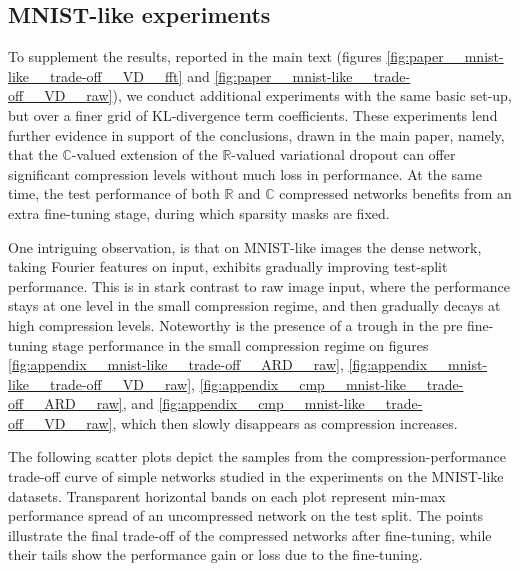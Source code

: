 \documentclass[a4paper,10pt]{article}
\newcommand{\real}{\mathbb{R}}
\newcommand{\cplx}{\mathbb{C}}
\begin{document}

\subsection{MNIST-like experiments} %
\label{sub:mnist_like_experiments}

To supplement the results, reported in the main text (figures \ref{fig:paper__mnist-like__trade-off__VD__fft}
and \ref{fig:paper__mnist-like__trade-off__VD__raw}), we conduct additional experiments
with the same basic set-up, but over a finer grid of KL-divergence term coefficients.
%
These experiments lend further evidence in support of the conclusions, drawn in the main
paper, namely, that the $\cplx$-valued extension of the $\real$-valued variational dropout
can offer significant compression levels without much loss in performance. At the same
time, the test performance of both $\real$ and $\cplx$ compressed networks benefits from
an extra fine-tuning stage, during which sparsity masks are fixed.

One intriguing observation, is that on MNIST-like images the dense network, taking Fourier
features on input, exhibits gradually improving test-split performance. This is in stark
contrast to raw image input, where the performance stays at one level in the small compression
regime, and then gradually decays at high compression levels. Noteworthy is the presence
of a trough in the pre fine-tuning stage performance in the small compression regime on figures
\ref{fig:appendix__mnist-like__trade-off__ARD__raw},
\ref{fig:appendix__mnist-like__trade-off__VD__raw},
\ref{fig:appendix__cmp__mnist-like__trade-off__ARD__raw},
and \ref{fig:appendix__cmp__mnist-like__trade-off__VD__raw}, which then slowly disappears
as compression increases.

The following scatter plots depict the samples from the compression-performance trade-off
curve of simple networks studied in the experiments on the MNIST-like datasets. Transparent
horizontal bands on each plot represent min-max performance spread of an uncompressed
network on the test split. The points illustrate the final trade-off of the compressed
networks after fine-tuning, while their tails show the performance gain or loss due to
the fine-tuning.
\end{document}
